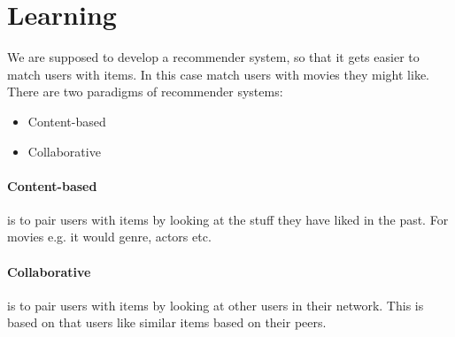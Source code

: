 \section{Learning}
We are supposed to develop a recommender system, so that it gets easier to match users with items.
In this case match users with movies they might like.
There are two paradigms of recommender systems:
\begin{itemize}
\item Content-based
\item Collaborative
\end{itemize}
\paragraph{Content-based} is to pair users with items by looking at the stuff they have liked in the past.
For movies e.g. it would genre, actors etc.

\paragraph{Collaborative} is to pair users with items by looking at other users in their network.
This is based on that users like similar items based on their peers.
